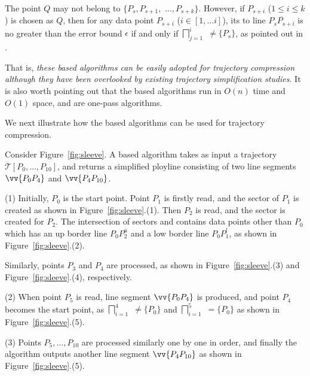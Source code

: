The point $Q$ may not belong to $\{P_{s}, P_{s+1},$ $\ldots, P_{s+k}\}$.
However, if $P_{s+i}$ ($1\le i\le k$) is chosen as $Q$, then
for any data point $P_{s+i}$ ($i \in [1, ... i]$), its \ped to
line $\overline{P_sP_{s+i}}$ is no greater than the error bound $\epsilon$ if and only if $\bigsqcap_{j=1}^{i}$ $\ne \{P_s\}$, as pointed out in \cite{Zhao:Sleeve}.

 That is, {\em these \cia based algorithms can be easily adopted for trajectory compression although they have been overlooked by existing trajectory simplification studies}.  It is also worth pointing out that the \cia based algorithms  run in $O(n)$ time and $O(1)$ space, and are one-pass algorithms.

We next illustrate how the \cia based algorithms can be used for trajectory compression.



\begin{example}
\label{exm-alg-sleeve}
Consider Figure~\ref{fig:sleeve}. A \cia based algorithm takes as input a trajectory $\dddot{\mathcal{T}}[P_0, \ldots, P_{10}]$, and returns a simplified ployline consisting of two line segments $\vv{P_0P_4}$ and  $\vv{P_4P_{10}}$.

\sstab(1) Initially, $P_0$ is the start point. Point $P_1$ is firstly read, and the sector  of $P_1$ is created as shown in Figure~\ref{fig:sleeve}.(1).
Then $P_2$ is read, and the sector   is created for $P_2$. The intersection of sectors  and   contains data points other than $P_0$  which has an up border line $P_0P_2^u$ and a low border line $P_0P_1^l$, as shown in Figure~\ref{fig:sleeve}.(2).

Similarly, points $P_3$ and $P_4$ are processed, as shown in Figure~\ref{fig:sleeve}.(3) and Figure~\ref{fig:sleeve}.(4), respectively.

\sstab(2) When point $P_5$ is read,  line segment $\vv{P_0P_4}$ is produced, and point $P_4$ becomes the start point, as $\bigsqcap_{i=1}^{4}$ $\ne\{P_0\}$ and $\bigsqcap_{i=1}^{5}$ $=\{P_0\}$ as shown in Figure~\ref{fig:sleeve}.(5).


\sstab(3) Points $P_5, \ldots, P_{10}$ are processed similarly one by one in order, and finally the algorithm outputs another line segment $\vv{P_4P_{10}}$ as shown in Figure~\ref{fig:sleeve}.(5).
\end{example}




